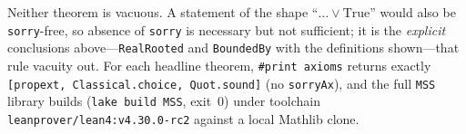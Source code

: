 \documentclass[11pt]{article}
\newcommand{\lean}[1]{{\def\_{\textunderscore\allowbreak}\texttt{#1}}}
\begin{document}
\noindent Neither theorem is vacuous. A statement of the shape
``$\dots\lor\mathrm{True}$'' would also be \lean{sorry}-free, so absence of
\lean{sorry} is necessary but not sufficient; it is the \emph{explicit} conclusions
above---\lean{RealRooted} and \lean{BoundedBy} with the definitions shown---that
rule vacuity out. For each headline theorem, \lean{\#print axioms} returns exactly
\lean{[propext, Classical.choice, Quot.sound]} (no \lean{sorryAx}), and the full
\lean{MSS} library builds (\lean{lake build MSS}, exit~0) under toolchain
\lean{leanprover/lean4:v4.30.0-rc2} against a local Mathlib clone.



\end{document}
